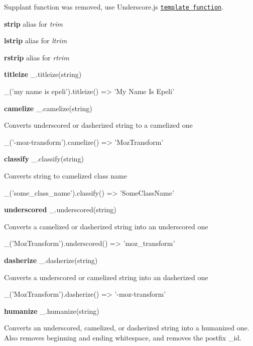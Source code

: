 Supplant function was removed, use Underscore.\+js \href{http://documentcloud.github.com/underscore/#template}{\tt template function}.

{\bfseries strip} alias for {\itshape trim}

{\bfseries lstrip} alias for {\itshape ltrim}

{\bfseries rstrip} alias for {\itshape rtrim}

{\bfseries titleize} \+\_\+.\+titleize(string)


\begin{DoxyCode}
\_('my name is epeli').titleize()
=> 'My Name Is Epeli'
\end{DoxyCode}


{\bfseries camelize} \+\_\+.\+camelize(string)

Converts underscored or dasherized string to a camelized one


\begin{DoxyCode}
\_('-moz-transform').camelize()
=> 'MozTransform'
\end{DoxyCode}


{\bfseries classify} \+\_\+.\+classify(string)

Converts string to camelized class name


\begin{DoxyCode}
\_('some\_class\_name').classify()
=> 'SomeClassName'
\end{DoxyCode}


{\bfseries underscored} \+\_\+.\+underscored(string)

Converts a camelized or dasherized string into an underscored one


\begin{DoxyCode}
\_('MozTransform').underscored()
=> 'moz\_transform'
\end{DoxyCode}


{\bfseries dasherize} \+\_\+.\+dasherize(string)

Converts a underscored or camelized string into an dasherized one


\begin{DoxyCode}
\_('MozTransform').dasherize()
=> '-moz-transform'
\end{DoxyCode}


{\bfseries humanize} \+\_\+.\+humanize(string)

Converts an underscored, camelized, or dasherized string into a humanized one. Also removes beginning and ending whitespace, and removes the postfix \textquotesingle{}\+\_\+id\textquotesingle{}.


